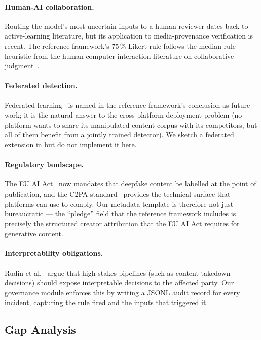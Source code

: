 \documentclass[11pt,a4paper]{article}
\theoremstyle{definition}
\theoremstyle{plain}
\theoremstyle{remark}
\begin{document}
\paragraph{Human-AI collaboration.}
Routing the model's most-uncertain inputs to a human reviewer dates
back to active-learning literature, but its application to
media-provenance verification is recent. The reference framework's
75\,\%-Likert rule follows the median-rule heuristic from the
human-computer-interaction literature on collaborative
judgment~\cite{bib43}.

\paragraph{Federated detection.}
Federated learning~\cite{bib40} is named in the reference framework's
conclusion as future work; it is the natural answer to the
cross-platform deployment problem (no platform wants to share its
manipulated-content corpus with its competitors, but all of them
benefit from a jointly trained detector). We sketch a federated
extension in  but do not implement it here.

\paragraph{Regulatory landscape.}
The EU AI Act~\cite{bib45} now mandates that deepfake content be
labelled at the point of publication, and the C2PA
standard~\cite{bib42} provides the technical surface that platforms
can use to comply. Our metadata template is therefore not just
bureaucratic --- the ``pledge'' field that the reference framework
includes is precisely the structured creator attribution that the EU
AI Act requires for generative content.

\paragraph{Interpretability obligations.}
Rudin et al.~\cite{bib41} argue that high-stakes pipelines (such as
content-takedown decisions) should expose interpretable decisions to
the affected party. Our governance module enforces this by writing a
JSONL audit record for every incident, capturing the rule fired and
the inputs that triggered it.

\subsection{Gap Analysis}\label{sec:gaps}
\end{document}
